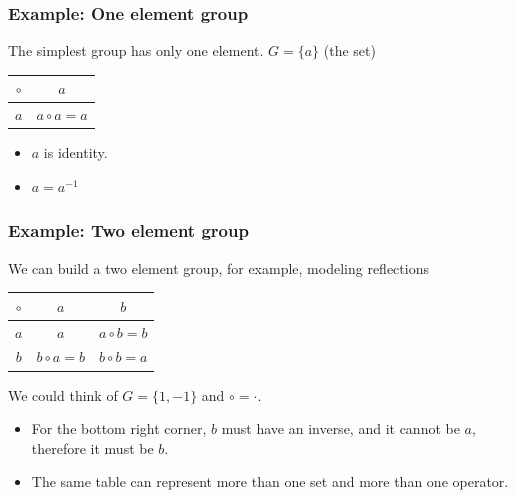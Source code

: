 \documentclass[10pt]{article}
\begin{document}
\subsubsection*{Example: One element group}
The simplest group has only one element.  $G = \{a\}$ (the set)
\begin{center}
    \begin{tabular}{c|c}
        $\circ$ & $a$ \\ \hline
        $a$ & $a \circ a = a$
    \end{tabular}
\end{center}
\begin{itemize}
    \item $a$ is identity.
    \item $a = a^{-1}$
\end{itemize}

\subsubsection*{Example: Two element group}
We can build a two element group, for example, modeling reflections
\begin{center}
    \begin{tabular}{c|cc}
        $\circ$ & $a$ & $b$ \\ \hline
        $a$ & $a$ & $a \circ b = b$ \\
        $b$ & $b \circ a = b$ & $b \circ b = a$
    \end{tabular}
\end{center}
We could think of $G = \{1, -1\}$ and $\circ = \cdot$.
\begin{itemize}
    \item For the bottom right corner, $b$ must have an inverse, and it cannot be $a$, therefore it must be $b$.
    \item The same table can represent more than one set and more than one operator.
\end{itemize}
\end{document}
